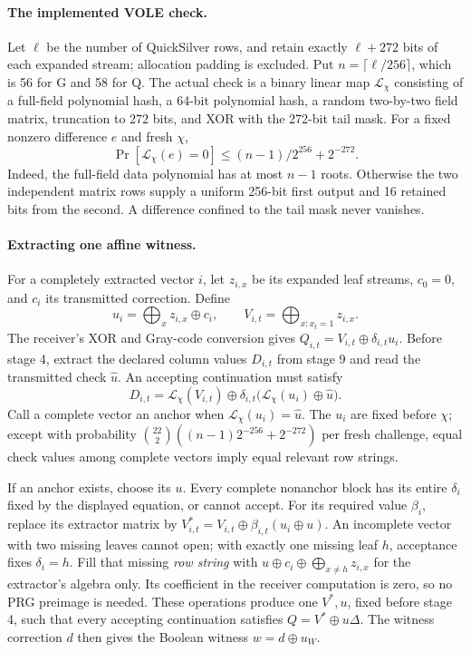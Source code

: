 \paragraph{The implemented VOLE check.}
Let $\ell$ be the number of QuickSilver rows, and retain exactly $\ell+272$ bits of each expanded stream; allocation padding is excluded. Put $n=\lceil\ell/256\rceil$, which is 56 for G and 58 for Q. The actual check is a binary linear map $\mathcal L_\chi$ consisting of a full-field polynomial hash, a 64-bit polynomial hash, a random two-by-two field matrix, truncation to 272 bits, and XOR with the 272-bit tail mask. For a fixed nonzero difference $e$ and fresh $\chi$,
\[
 \Pr[\mathcal L_\chi(e)=0]\le (n-1)/2^{256}+2^{-272}.
\]
Indeed, the full-field data polynomial has at most $n-1$ roots. Otherwise the two independent matrix rows supply a uniform 256-bit first output and 16 retained bits from the second. A difference confined to the tail mask never vanishes.

\paragraph{Extracting one affine witness.}
For a completely extracted vector $i$, let $z_{i,x}$ be its expanded leaf streams, $c_0=0$, and $c_i$ its transmitted correction. Define
\[
 u_i=\bigoplus_x z_{i,x}\oplus c_i,\qquad
 V_{i,t}=\bigoplus_{x:x_t=1}z_{i,x}.
\]
The receiver's XOR and Gray-code conversion gives
$Q_{i,t}=V_{i,t}\oplus\delta_{i,t}u_i$.
Before stage 4, extract the declared column values $D_{i,t}$ from stage 9 and read the transmitted check $\widehat u$. An accepting continuation must satisfy
\[
 D_{i,t}=\mathcal L_\chi(V_{i,t})\oplus
 \delta_{i,t}\bigl(\mathcal L_\chi(u_i)\oplus\widehat u\bigr).
\]
Call a complete vector an anchor when $\mathcal L_\chi(u_i)=\widehat u$. The $u_i$ are fixed before $\chi$; except with probability $\binom{22}{2}((n-1)2^{-256}+2^{-272})$ per fresh challenge, equal check values among complete vectors imply equal relevant row strings.

If an anchor exists, choose its $u$. Every complete nonanchor block has its entire $\delta_i$ fixed by the displayed equation, or cannot accept. For its required value $\beta_i$, replace its extractor matrix by $V^*_{i,t}=V_{i,t}\oplus\beta_{i,t}(u_i\oplus u)$. An incomplete vector with two missing leaves cannot open; with exactly one missing leaf $h$, acceptance fixes $\delta_i=h$. Fill that missing \emph{row string} with $u\oplus c_i\oplus\bigoplus_{x\ne h}z_{i,x}$ for the extractor's algebra only. Its coefficient in the receiver computation is zero, so no PRG preimage is needed. These operations produce one $V^*,u$, fixed before stage 4, such that every accepting continuation satisfies $Q=V^*\oplus u\Delta$. The witness correction $d$ then gives the Boolean witness $w=d\oplus u_W$.

